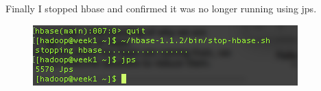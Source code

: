 \documentclass[10pt]{article}
\begin{document}
\par
{}%
\hfill
{}%
\par
Finally I stopped hbase and confirmed it was no longer running using jps. 
\begin{figure}[!h]
\includegraphics[scale=0.37]{quit_hbase.png}
\centering
\end{figure}\\
\end{document}
